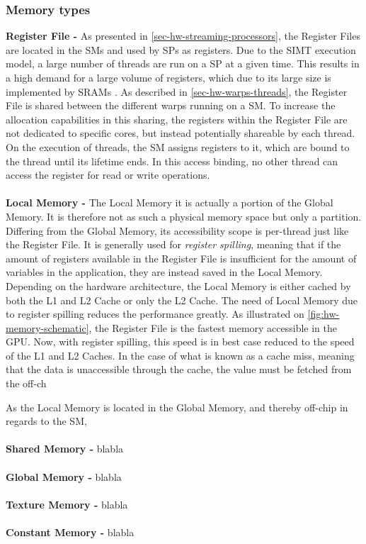 \subsubsection{Memory types}
\label{sec-mem-types}
\textbf{Register File -} As presented in \cref{sec-hw-streaming-processors}, the Register Files are located in the SMs and used by SPs as registers.
Due to the SIMT execution model, a large number of threads are run on a SP at a given time.
This results in a high demand for a large volume of registers, which due to its large size is implemented by SRAMs \cite{Li2016}.
As described in \cref{sec-hw-warps-threads}, the Register File is shared between the different warps running on a SM.
To increase the allocation capabilities in this sharing, the registers within the Register File are not dedicated to specific cores, but instead potentially shareable by each thread.
On the execution of threads, the SM assigns registers to it, which are bound to the thread until its lifetime ends.
In this access binding, no other thread can access the register for read or write operations.
\\\\
\textbf{Local Memory -} The Local Memory it is actually a portion of the Global Memory.
It is therefore not as such a physical memory space but only a partition.
Differing from the Global Memory, its accessibility scope is per-thread just like the Register File.
It is generally used for \textit{register spilling}, meaning that if the amount of registers available in the Register File is insufficient for the amount of variables in the application, they are instead saved in the Local Memory.
Depending on the hardware architecture, the Local Memory is either cached by both the L1 and L2 Cache or only the L2 Cache.
The need of Local Memory due to register spilling reduces the performance greatly.
As illustrated on \cref{fig:hw-memory-schematic}, the Register File is the fastest memory accessible in the GPU. %
Now, with register spilling, this speed is in best case reduced to the speed of the L1 and L2 Caches.
In the case of what is known as a cache miss, meaning that the data is unaccessible through the cache, the value must be fetched from the off-ch


As the Local Memory is located in the Global Memory, and thereby off-chip in regards to the SM,  
\\\\
\textbf{Shared Memory -} blabla
\\\\
\textbf{Global Memory -} blabla
\\\\
\textbf{Texture Memory -} blabla
\\\\
\textbf{Constant Memory -} blabla


